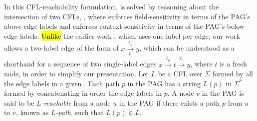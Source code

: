 





In this  CFL-reachability formulation,  is
solved by reasoning about
 the intersection of two  CFLs,  \manuCapLFC, where
\manuLF enforces field-sensitivity in terms of
the PAG's above-edge labels and \manuLC  enforces context-sensitivity
in terms of
 the PAG's below-edge labels. \hl{Unlike} the earlier work
\cite{sridharan2005demand, sridharan2006refinement, zheng2008demand, yan2011demand, shang2012demand}, which
uses one
label per \pag edge,  our work
allows  a two-label \pag edge of the form
of $x\xrightarrow[\ell_b]{\ell_a}y$, which
 can be understood as a shorthand for a sequence of 
two single-label edges $x \xrightarrow{\ell_a} t \xrightarrow{\ell_b}  y$, where  $t$  is a fresh node, in order to simplify our presentation. 
 Let $L$ be a CFL  over $\Sigma$ formed by all the edge labels in
 a given \pag.
Each path $p$ in the PAG has a string $L(p)$
in $\Sigma^*$
formed by concatenating in order the  edge labels in $p$.
A node $v$ in the  PAG is  said to be \emph{$L$-reachable} from a node
$u$ in the PAG if there exists a path $p$ from $u$ to $v$,
known as \emph{$L$-path}, such that $L(p)\in L$. 

\begin{comment}
For every  CFL $L$ defined
over  $\Sigma$  in this paper, its grammar uses exclusively either only 
the above-edge labels or 
 below-edge labels. Consider the above-edge-label case.
 For every production of the form
 $ \mathbf{A} \rightarrow ... \ell_a ...$, where $\ell_a$ is an above-edge
 label in $x\xrightarrow[\ell_b]{\ell_a}y$, we assume that it will undergo
 an implicit transformation as follows. First of all, we will modify the
 production to become
  $ \mathbf{A} \rightarrow ... \ell_a  \mathbf{A}' ...$.  introduce
  $ \mathbf{A}' \rightarrow \ell_b$, together with
    $ \mathbf{A}' \rightarrow \epsilon$ if $x\xrightarrow{\ell_a}y$
    also exists.
\end{comment}
 

